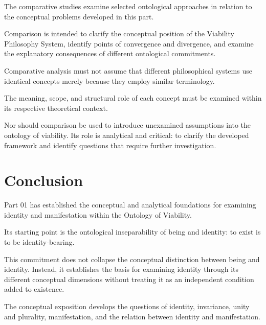 The comparative studies examine selected
ontological approaches in relation to the
conceptual problems developed in this part.

Comparison is intended to clarify the conceptual
position of the Viability Philosophy System,
identify points of convergence and divergence,
and examine the explanatory consequences of
different ontological commitments.

Comparative analysis must not assume that
different philosophical systems use identical
concepts merely because they employ similar
terminology.

The meaning, scope, and structural role of
each concept must be examined within its
respective theoretical context.

Nor should comparison be used to introduce
unexamined assumptions into the ontology of
viability. Its role is analytical and critical:
to clarify the developed framework and identify
questions that require further investigation.







\section*{Conclusion}

Part 01 has established the conceptual and
analytical foundations for examining identity
and manifestation within the Ontology of Viability.

Its starting point is the ontological inseparability
of being and identity: to exist is to be
identity-bearing.

This commitment does not collapse the conceptual
distinction between being and identity. Instead,
it establishes the basis for examining identity
through its different conceptual dimensions
without treating it as an independent condition
added to existence.

The conceptual exposition develops the questions
of identity, invariance, unity and plurality,
manifestation, and the relation between identity
and manifestation.

